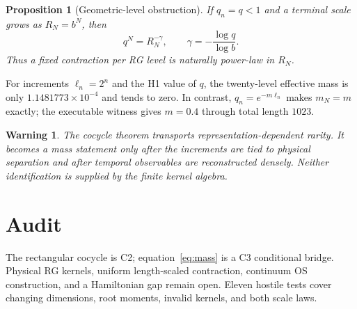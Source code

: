 \documentclass[11pt]{article}
\newtheorem{proposition}{Proposition}
\newtheorem{warning}{Warning}
\begin{document}
\begin{proposition}[Geometric-level obstruction]
If $q_n=q<1$ and a terminal scale grows as $R_N=b^N$, then
\[
 q^N=R_N^{-\gamma},\qquad \gamma=-\frac{\log q}{\log b}.
\]
Thus a fixed contraction per RG level is naturally power-law in $R_N$.
\end{proposition}

For increments $\ell_n=2^n$ and the H1 value of $q$, the twenty-level effective
mass is only $1.1481773\times10^{-4}$ and tends to zero.  In contrast,
$q_n=e^{-m\ell_n}$ makes $m_N=m$ exactly; the executable witness gives
$m=0.4$ through total length $1023$.

\begin{warning}
The cocycle theorem transports representation-dependent rarity.  It becomes a
mass statement only after the increments are tied to physical separation and
after temporal observables are reconstructed densely.  Neither identification
is supplied by the finite kernel algebra.
\end{warning}

\section{Audit}
The rectangular cocycle is C2; equation~\eqref{eq:mass} is a C3 conditional
bridge.  Physical RG kernels, uniform length-scaled contraction, continuum OS
construction, and a Hamiltonian gap remain open.  Eleven hostile tests cover
changing dimensions, root moments, invalid kernels, and both scale laws.
\end{document}
